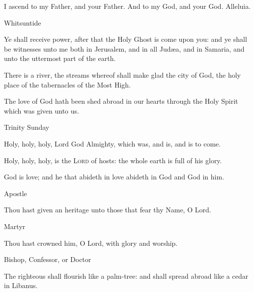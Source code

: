 \begin{multicols}{2}
    I ascend to my Father, and your Father. And to my God, and your God. Alleluia.

\begin{inhead}
Whitsuntide
\end{inhead}\noindent
    Ye shall receive power, after that the Holy Ghost is come upon you: and ye shall be witnesses unto me both in Jerusalem, and in all Jud{\ae}a, and in Samaria, and unto the uttermost part of the earth.\par
    
    There is a river, the streams whereof shall make glad the city of God, the holy place of the tabernacles of the Most High.\par

    The love of God hath been shed abroad in our hearts through the Holy Spirit which was given unto us.
\begin{inhead}
Trinity Sunday
\end{inhead}\noindent
    Holy, holy, holy, Lord God Almighty, which was, and is, and is to come.
    \par
    Holy, holy, holy, is the \textsc{Lord} of hosts: the whole earth is full of his glory. 
    \par
    God is love; and he that abideth in love abideth in God and God in him.

\begin{inhead}
Apostle
\end{inhead}\noindent
Thou hast given an heritage unto those that fear thy Name, O Lord.

\begin{inhead}
Martyr
\end{inhead}\noindent
Thou hast crowned him, O Lord, with glory and worship.

\begin{inhead}
Bishop, Confessor, or Doctor
\end{inhead}\noindent
The righteous shall flourish like a palm-tree: and shall spread abroad like a cedar in
Libanus.


\end{multicols}
